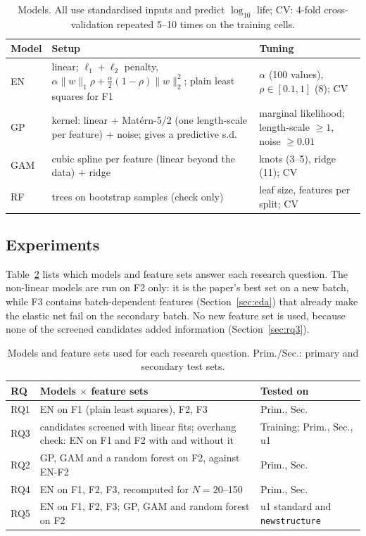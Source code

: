 \begin{table}[!htb]
\centering
\caption{Models. All use standardised inputs and predict $\log_{10}$ life;
CV: 4-fold cross-validation repeated 5--10 times on the training cells.}
\label{tab:models}
\small
\setlength{\tabcolsep}{2.5pt}
\begin{tabular}{@{}>{\raggedright\arraybackslash}p{}>{\raggedright\arraybackslash}p{}>{\raggedright\arraybackslash}p{}@{}}
\toprule
Model & Setup & Tuning \\
\midrule
EN~\cite{severson2019} & linear; $\ell_1+\ell_2$ penalty, $\alpha\|w\|_1\rho+\tfrac{\alpha}{2}(1-\rho)\|w\|_2^2$; plain least squares for F1 & $\alpha$ (100 values), $\rho\in[0.1,1]$ (8); CV \\
GP & kernel: linear $+$ Mat\'ern-5/2 (one length-scale per feature) $+$ noise; gives a predictive s.d. & marginal likelihood; length-scale $\ge1$, noise $\ge0.01$ \\
GAM & cubic spline per feature (linear beyond the data) $+$ ridge & knots (3--5), ridge (11); CV \\
RF & 300 trees on bootstrap samples (check only) & leaf size, features per split; CV \\
\bottomrule
\end{tabular}
\end{table}

\subsection{Experiments}
Table~\ref{tab:experiments} lists which models and feature sets answer each
research question. The non-linear models are run on F2 only: it is the
paper's best set on a new batch, while F3 contains batch-dependent features
(Section~\ref{sec:eda}) that already make the elastic net fail on the
secondary batch. No new feature set is used, because none of the screened
candidates added information (Section~\ref{sec:rq3}).

\begin{table}[!htb]
\centering
\caption{Models and feature sets used for each research question. Prim./Sec.:
primary and secondary test sets.}
\label{tab:experiments}
\small
\setlength{\tabcolsep}{2.5pt}
\begin{tabular}{@{}l>{\raggedright\arraybackslash}p{}>{\raggedright\arraybackslash}p{}@{}}
\toprule
RQ & Models $\times$ feature sets & Tested on \\
\midrule
RQ1 & EN on F1 (plain least squares), F2, F3 & Prim., Sec. \\
RQ3 & 19 candidates screened with linear fits; overhang check: EN on F1 and F2 with and without it & Training; Prim., Sec., u1 \\
RQ2 & GP, GAM and a random forest on F2, against EN-F2 & Prim., Sec. \\
RQ4 & EN on F1, F2, F3, recomputed for $N=20$--150 & Prim., Sec. \\
RQ5 & EN on F1, F2, F3; GP, GAM and random forest on F2 & u1 standard and \texttt{newstructure} \\
\bottomrule
\end{tabular}
\end{table}
